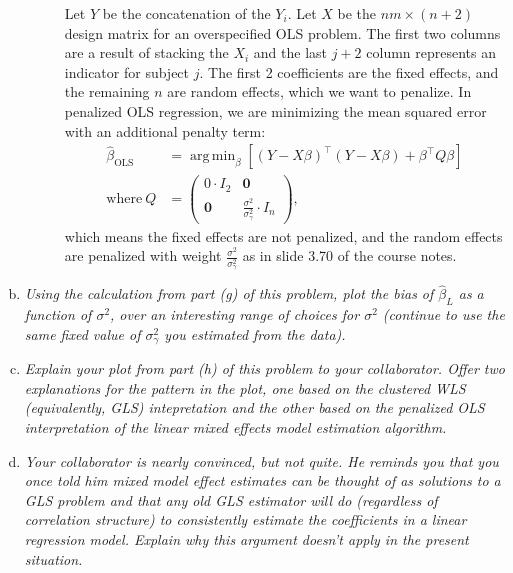 \documentclass[11pt, letterpaper]{article}
\DeclareMathOperator*{\argmin}{arg\,min}
\begin{document}
\begin{enumerate}[(a)]
\begin{description}
  Let $Y$ be the concatenation of the $Y_i$. Let $X$ be the $nm \times (n + 2)$
  design matrix for an overspecified OLS problem. The first two columns are a
  result of stacking the $X_i$ and the last $j + 2$ column represents an
  indicator for subject $j$. The first 2 coefficients are the fixed effects, and
  the remaining $n$ are random effects, which we want to penalize. In penalized
  OLS regression, we are minimizing the mean squared error with an additional
  penalty term:
  \begin{align}
    \hat{\beta}_{\text{OLS}}
    &= \argmin_{\beta}\left[
      \left(Y - X\beta\right)^\intercal\left(Y - X\beta\right)
      +
      \beta^\intercal Q\beta
      \right] \label{eqn:penalized_ols_objective}\\
    \text{where}~
    Q &= \begin{pmatrix}
      0 \cdot I_2 & \mathbf{0} \\
      \mathbf{0} & \frac{\sigma^2}{\sigma_\gamma^2} \cdot I_n
    \end{pmatrix}, \nonumber
  \end{align}
  which means the fixed effects are not penalized, and the random effects are
  penalized with weight $\frac{\sigma^2}{\sigma_\gamma^2}$ as in slide 3.70 of
  the course notes.
  
\end{description}

\item  {\em Using the calculation from part (g) of this problem, plot the bias of $\hat{\beta}_L$ as
a function of $\sigma^2$, over an interesting range of choices for $\sigma^2$ (continue to use the same fixed value
of $\sigma^2_\gamma$ you estimated from the data).}
\item {\em Explain your plot from part (h) of this problem to your collaborator.  Offer two explanations for the pattern in the plot, one based on the clustered WLS (equivalently, GLS) intepretation and the other based on the penalized OLS interpretation of the linear mixed effects model estimation algorithm.}
\item {\em Your collaborator is nearly convinced, but not quite.  He reminds you that you
once told him mixed model effect estimates can be thought of as solutions to a GLS problem and that
any old GLS estimator will do (regardless of correlation structure) to consistently estimate the 
coefficients in a linear regression model.  Explain why this argument doesn't apply in the present situation.}
\end{enumerate}
\end{document}
